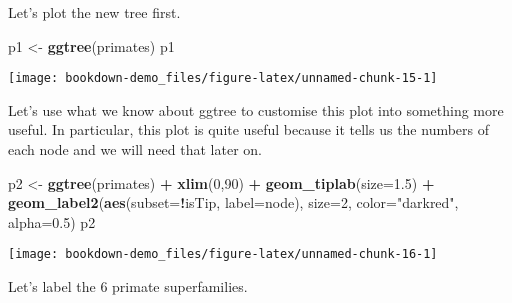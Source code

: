 \documentclass[]{book}
\newenvironment{Shaded}{\begin{snugshade}}{\end{snugshade}}
\newcommand{\KeywordTok}[1]{\textcolor[rgb]{0.13,0.29,0.53}{\textbf{#1}}}
\newcommand{\DataTypeTok}[1]{\textcolor[rgb]{0.13,0.29,0.53}{#1}}
\newcommand{\DecValTok}[1]{\textcolor[rgb]{0.00,0.00,0.81}{#1}}
\newcommand{\FloatTok}[1]{\textcolor[rgb]{0.00,0.00,0.81}{#1}}
\newcommand{\StringTok}[1]{\textcolor[rgb]{0.31,0.60,0.02}{#1}}
\newcommand{\OperatorTok}[1]{\textcolor[rgb]{0.81,0.36,0.00}{\textbf{#1}}}
\newcommand{\NormalTok}[1]{#1}
\begin{document}
Let's plot the new tree first.

\begin{Shaded}
\begin{Highlighting}[]
\NormalTok{p1 <-}\StringTok{ }\KeywordTok{ggtree}\NormalTok{(primates)}
\NormalTok{p1}
\end{Highlighting}
\end{Shaded}

\begin{center}\texttt{[image: bookdown-demo\_files/figure-latex/unnamed-chunk-15-1]} \end{center}

Let's use what we know about ggtree to customise this plot into
something more useful. In particular, this plot is quite useful because
it tells us the numbers of each node and we will need that later on.

\begin{Shaded}
\begin{Highlighting}[]
\NormalTok{p2 <-}\StringTok{ }\KeywordTok{ggtree}\NormalTok{(primates) }\OperatorTok{+}
\StringTok{  }\KeywordTok{xlim}\NormalTok{(}\DecValTok{0}\NormalTok{,}\DecValTok{90}\NormalTok{) }\OperatorTok{+}\StringTok{ }
\StringTok{  }\KeywordTok{geom_tiplab}\NormalTok{(}\DataTypeTok{size=}\FloatTok{1.5}\NormalTok{) }\OperatorTok{+}
\StringTok{  }\KeywordTok{geom_label2}\NormalTok{(}\KeywordTok{aes}\NormalTok{(}\DataTypeTok{subset=}\OperatorTok{!}\NormalTok{isTip, }\DataTypeTok{label=}\NormalTok{node), }\DataTypeTok{size=}\DecValTok{2}\NormalTok{, }\DataTypeTok{color=}\StringTok{"darkred"}\NormalTok{, }\DataTypeTok{alpha=}\FloatTok{0.5}\NormalTok{)}
\NormalTok{p2}
\end{Highlighting}
\end{Shaded}

\begin{center}\texttt{[image: bookdown-demo\_files/figure-latex/unnamed-chunk-16-1]} \end{center}

Let's label the 6 primate superfamilies.
\end{document}
